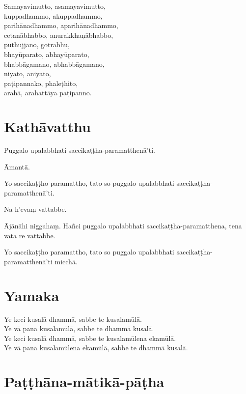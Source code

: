 Samayavimutto, asamayavimutto,\\
kuppadhammo, akuppadhammo,\\
parihānadhammo, aparihānadhammo,\\
cetanābhabbo, anurakkhaṇābhabbo,\\
puthujjano, gotrabhū,\\
bhayūparato, abhayūparato,\\
bhabbāgamano, abhabbāgamano,\\
niyato, aniyato,\\
paṭipannako, phaleṭhito,\\
arahā, arahattāya paṭipanno.



\section{Kathāvatthu}

Puggalo upalabbhati saccikaṭṭha-paramatthenā'ti.

Āmantā.

Yo saccikaṭṭho paramattho, tato so puggalo upalabbhati
saccikaṭṭha-paramatthenā'ti.

Na h’evaṃ vattabbe.

Ājānāhi niggahaṃ. Hañci puggalo upalabbhati
saccikaṭṭha-paramatthena, tena vata re vattabbe.

Yo saccikaṭṭho paramattho, tato so puggalo upalabbhati
saccikaṭṭha-paramatthenā'ti micchā.



\section{Yamaka}

Ye keci kusalā dhammā, sabbe te kusalamūlā.\\ 
Ye vā pana kusalamūlā, sabbe te dhammā kusalā.\\
Ye keci kusalā dhammā, sabbe te kusalamūlena ekamūlā.\\ 
Ye vā pana kusalamūlena ekamūlā, sabbe te dhammā kusalā.



\section{Paṭṭhāna-mātikā-pāṭha}

